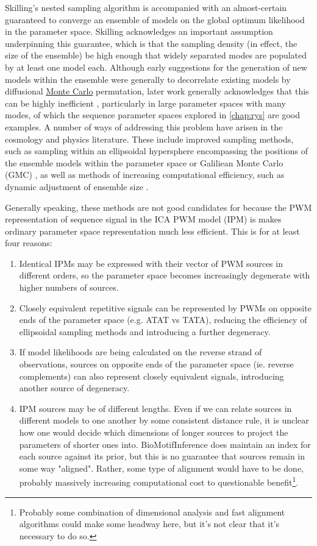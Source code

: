 Skilling's nested sampling algorithm is accompanied with an almost-certain guaranteed to converge an ensemble of models on the global optimum likelihood in the parameter space\cite{Skilling2006}. Skilling acknowledges an important assumption underpinning this guarantee, which is that the sampling density (in effect, the size of the ensemble) be high enough that widely separated modes are populated by at least one model each. Although early suggestions for the generation of new models within the ensemble were generally to decorrelate existing models by diffusional \hyperref[ssec:MonteCarlo]{Monte Carlo} permutation, later work generally acknowledges that this can be highly inefficient \cite{Skilling2012}, particularly in large parameter spaces with many modes, of which the sequence parameter spaces explored in \autoref{chap:rys} are good examples. A number of ways of addressing this problem have arisen in the cosmology and physics literature. These include improved sampling methods, such as sampling within an ellipsoidal hypersphere encompassing the positions of the ensemble models within the parameter space \cite{Feroz2008,Feroz2009} or Galiliean Monte Carlo (GMC) \cite{Skilling2012}, as well as methods of increasing computational efficiency, such as dynamic adjustment of ensemble size \cite{Higson2019}. 

Generally speaking, these methods are not good candidates for  because the PWM representation of sequence signal in the ICA PWM model (IPM) is makes ordinary parameter space representation much less efficient. This is for at least four reasons:

\begin{enumerate}
    \item\label{identicalmodels} Identical IPMs may be expressed with their vector of PWM sources in different orders, so the parameter space becomes increasingly degenerate with higher numbers of sources.
    \item Closely equivalent repetitive signals can be represented by PWMs on opposite ends of the parameter space (e.g. ATAT vs TATA), reducing the efficiency of ellipsoidal sampling methods and introducing a further degeneracy.
    \item If model likelihoods are being calculated on the reverse strand of observations, sources on opposite ends of the parameter space (ie. reverse complements) can also represent closely equivalent signals, introducing another source of degeneracy.
    \item IPM sources may be of different lengths. Even if we can relate sources in different models to one another by some consistent distance rule, it is unclear how one would decide which dimensions of longer sources to project the parameters of shorter ones into. BioMotifInference does maintain an index for each source against its prior, but this is no guarantee that sources remain in some way "aligned". Rather, some type of alignment would have to be done, probably massively increasing computational cost to questionable benefit\footnote{Probably some combination of dimensional analysis and fast alignment algorithms could make some headway here, but it's not clear that it's necessary to do so.}.
\end{enumerate}

